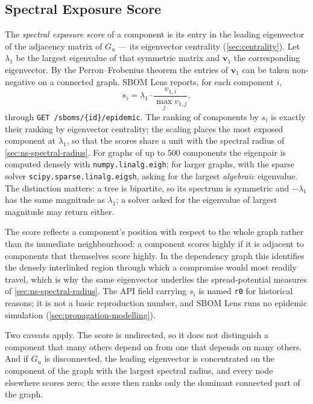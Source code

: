 \subsection{Spectral Exposure Score}
\label{sec:spectral-exposure}

The \textit{spectral exposure score} of a component is its entry in the leading eigenvector of the adjacency matrix of \(G_u\) --- its eigenvector centrality (\autoref{sec:centrality}). Let \(\lambda_1\) be the largest eigenvalue of that symmetric matrix and \(\mathbf{v}_1\) the corresponding eigenvector. By the Perron--Frobenius theorem the entries of \(\mathbf{v}_1\) can be taken non-negative on a connected graph. SBOM Lens reports, for each component \(i\),
\[
    s_i = \lambda_1 \cdot \frac{v_{1,i}}{\max_j v_{1,j}},
\]
through \texttt{GET /sboms/\{id\}/epidemic}. The ranking of components by \(s_i\) is exactly their ranking by eigenvector centrality; the scaling places the most exposed component at \(\lambda_1\), so that the scores share a unit with the spectral radius of \autoref{sec:ns-spectral-radius}. For graphs of up to 500 components the eigenpair is computed densely with \texttt{numpy.linalg.eigh}; for larger graphs, with the sparse solver \texttt{scipy.sparse.linalg.eigsh}, asking for the largest \emph{algebraic} eigenvalue. The distinction matters: a tree is bipartite, so its spectrum is symmetric and \(-\lambda_1\) has the same magnitude as \(\lambda_1\); a solver asked for the eigenvalue of largest magnitude may return either.

The score reflects a component's position with respect to the whole graph rather than its immediate neighbourhood: a component scores highly if it is adjacent to components that themselves score highly. In the dependency graph this identifies the densely interlinked region through which a compromise would most readily travel, which is why the same eigenvector underlies the spread-potential measures of \autoref{sec:ns-spectral-radius}. The API field carrying \(s_i\) is named \texttt{r0} for historical reasons; it is not a basic reproduction number, and SBOM Lens runs no epidemic simulation (\autoref{sec:propagation-modelling}).

Two caveats apply. The score is undirected, so it does not distinguish a component that many others depend on from one that depends on many others. And if \(G_u\) is disconnected, the leading eigenvector is concentrated on the component of the graph with the largest spectral radius, and every node elsewhere scores zero; the score then ranks only the dominant connected part of the graph.


